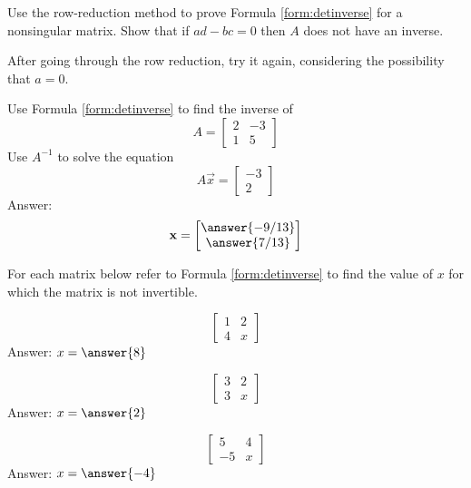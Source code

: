 \documentclass{ximera}
\begin{document}
\begin{problem}\label{prob:inverseformula}
Use the row-reduction method to prove Formula \ref{form:detinverse} for a nonsingular matrix.  Show that if $ad-bc=0$ then $A$ does not have an inverse.
\begin{hint}After going through the row reduction, try it again, considering the possibility that $a=0$.
\end{hint}
\end{problem}


\begin{problem}
Use Formula \ref{form:detinverse} to find the inverse of $$A=\begin{bmatrix}2&-3\\1&5\end{bmatrix}$$
Use $A^{-1}$ to solve the equation
$$A\vec{x}=\begin{bmatrix}-3\\2\end{bmatrix}$$
Answer:
$$\vec{x}=\begin{bmatrix}\answer{-9/13}\\\answer{7/13}\end{bmatrix}$$

\end{problem}

\begin{problem}
For each matrix below refer to  Formula \ref{form:detinverse} to find the value of $x$ for which the matrix is not invertible.  
\begin{problem}
$$\begin{bmatrix}1&2\\4&x\end{bmatrix}$$
Answer: $x=\answer{8}$
\end{problem}
\begin{problem}
$$\begin{bmatrix}3&2\\3&x\end{bmatrix}$$
Answer: $x=\answer{2}$
\end{problem}
\begin{problem}
$$\begin{bmatrix}5&4\\-5&x\end{bmatrix}$$
Answer: $x=\answer{-4}$
\end{problem}
\end{problem}

\end{document}
